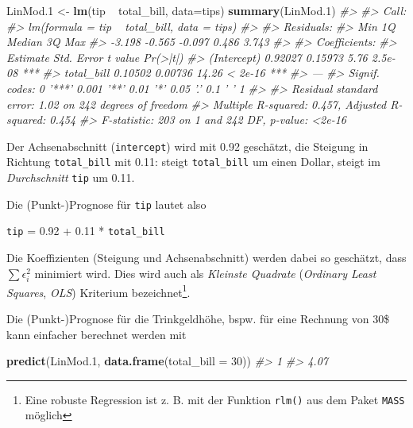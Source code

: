 \documentclass[12pt,ngerman,]{book}
\makeatletter
\newenvironment{Shaded}{\begin{snugshade}}{\end{snugshade}}
\newcommand{\KeywordTok}[1]{\textcolor[rgb]{0.13,0.29,0.53}{\textbf{{#1}}}}
\newcommand{\DataTypeTok}[1]{\textcolor[rgb]{0.13,0.29,0.53}{{#1}}}
\newcommand{\DecValTok}[1]{\textcolor[rgb]{0.00,0.00,0.81}{{#1}}}
\newcommand{\FloatTok}[1]{\textcolor[rgb]{0.00,0.00,0.81}{{#1}}}
\newcommand{\StringTok}[1]{\textcolor[rgb]{0.31,0.60,0.02}{{#1}}}
\newcommand{\CommentTok}[1]{\textcolor[rgb]{0.56,0.35,0.01}{\textit{{#1}}}}
\newcommand{\NormalTok}[1]{{#1}}
\let\rmarkdownfootnote\footnote%
\def\footnote{\protect\rmarkdownfootnote}
\newenvironment{kframe}{%
\medskip{}
\setlength{\fboxsep}{.8em}
 \def\at@end@of@kframe{}%
 \ifinner\ifhmode%
  \def\at@end@of@kframe{\end{minipage}}%
  \begin{minipage}{\columnwidth}%
 \fi\fi%
 \def\FrameCommand##1{\hskip\@totalleftmargin \hskip-\fboxsep
 \colorbox{shadecolor}{##1}\hskip-\fboxsep
     \hskip-\linewidth \hskip-\@totalleftmargin \hskip\columnwidth}%
 \MakeFramed {\advance\hsize-\width
   \@totalleftmargin\z@ \linewidth\hsize
   \@setminipage}}%
 {\par\unskip\endMakeFramed%
 \at@end@of@kframe}
\renewenvironment{Shaded}{\begin{kframe}}{\end{kframe}}
\makeatother
\begin{document}
\begin{Shaded}
\begin{Highlighting}[]
\NormalTok{LinMod}\FloatTok{.1} \NormalTok{<-}\StringTok{ }\KeywordTok{lm}\NormalTok{(tip ~}\StringTok{ }\NormalTok{total_bill, }\DataTypeTok{data=}\NormalTok{tips)}
\KeywordTok{summary}\NormalTok{(LinMod}\FloatTok{.1}\NormalTok{)}
\CommentTok{#> }
\CommentTok{#> Call:}
\CommentTok{#> lm(formula = tip ~ total_bill, data = tips)}
\CommentTok{#> }
\CommentTok{#> Residuals:}
\CommentTok{#>    Min     1Q Median     3Q    Max }
\CommentTok{#> -3.198 -0.565 -0.097  0.486  3.743 }
\CommentTok{#> }
\CommentTok{#> Coefficients:}
\CommentTok{#>             Estimate Std. Error t value Pr(>|t|)    }
\CommentTok{#> (Intercept)  0.92027    0.15973    5.76  2.5e-08 ***}
\CommentTok{#> total_bill   0.10502    0.00736   14.26  < 2e-16 ***}
\CommentTok{#> ---}
\CommentTok{#> Signif. codes:  0 '***' 0.001 '**' 0.01 '*' 0.05 '.' 0.1 ' ' 1}
\CommentTok{#> }
\CommentTok{#> Residual standard error: 1.02 on 242 degrees of freedom}
\CommentTok{#> Multiple R-squared:  0.457,  Adjusted R-squared:  0.454 }
\CommentTok{#> F-statistic:  203 on 1 and 242 DF,  p-value: <2e-16}
\end{Highlighting}
\end{Shaded}

Der Achsenabschnitt (\texttt{intercept}) wird mit 0.92 geschätzt, die
Steigung in Richtung \texttt{total\_bill} mit 0.11: steigt
\texttt{total\_bill} um einen Dollar, steigt im \emph{Durchschnitt}
\texttt{tip} um 0.11.

Die (Punkt-)Prognose für \texttt{tip} lautet also

\texttt{tip} = 0.92 + 0.11 * \texttt{total\_bill}

Die Koeffizienten (Steigung und Achsenabschnitt) werden dabei so
geschätzt, dass \(\sum \epsilon_i^2\) minimiert wird. Dies wird auch als
\emph{Kleinste Quadrate} (\emph{Ordinary Least Squares}, \emph{OLS})
Kriterium bezeichnet\footnote{Eine robuste Regression ist z. B. mit der
  Funktion \texttt{rlm()} aus dem Paket \texttt{MASS} möglich}.

Die (Punkt-)Prognose für die Trinkgeldhöhe, bspw. für eine Rechnung von
30\$ kann einfacher berechnet werden mit

\begin{Shaded}
\begin{Highlighting}[]
\KeywordTok{predict}\NormalTok{(LinMod}\FloatTok{.1}\NormalTok{, }\KeywordTok{data.frame}\NormalTok{(}\DataTypeTok{total_bill =} \DecValTok{30}\NormalTok{))}
\CommentTok{#>    1 }
\CommentTok{#> 4.07}
\end{Highlighting}
\end{Shaded}
\end{document}
